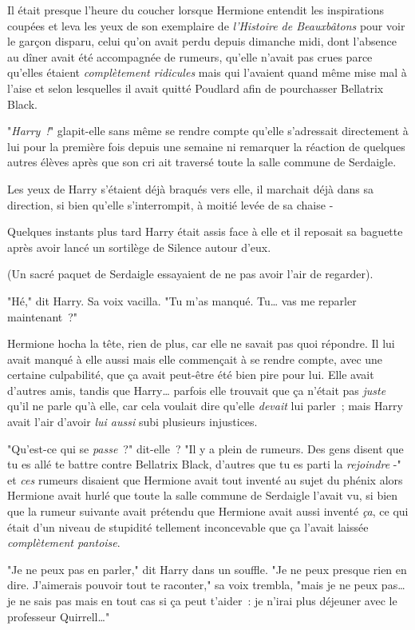 Il était presque l'heure du coucher lorsque Hermione entendit les inspirations coupées et leva les yeux de son exemplaire de \emph{l'Histoire de Beauxbâtons} pour voir le garçon disparu, celui qu'on avait perdu depuis dimanche midi, dont l'absence au dîner avait été accompagnée de rumeurs, qu'elle n'avait pas crues parce qu'elles étaient \emph{complètement ridicules} mais qui l'avaient quand même mise mal à l'aise et selon lesquelles il avait quitté Poudlard afin de pourchasser Bellatrix Black.

"\emph{Harry~!}" glapit-elle sans même se rendre compte qu'elle s'adressait directement à lui pour la première fois depuis une semaine ni remarquer la réaction de quelques autres élèves après que son cri ait traversé toute la salle commune de Serdaigle.

Les yeux de Harry s'étaient déjà braqués vers elle, il marchait déjà dans sa direction, si bien qu'elle s'interrompit, à moitié levée de sa chaise -

Quelques instants plus tard Harry était assis face à elle et il reposait sa baguette après avoir lancé un sortilège de Silence autour d'eux.

(Un sacré paquet de Serdaigle essayaient de ne pas avoir l'air de regarder).

"Hé," dit Harry. Sa voix vacilla. "Tu m'as manqué. Tu… vas me reparler maintenant~?"

Hermione hocha la tête, rien de plus, car elle ne savait pas quoi répondre. Il lui avait manqué à elle aussi mais elle commençait à se rendre compte, avec une certaine culpabilité, que ça avait peut-être été bien pire pour lui. Elle avait d'autres amis, tandis que Harry… parfois elle trouvait que ça n'était pas \emph{juste} qu'il ne parle qu'à elle, car cela voulait dire qu'elle \emph{devait} lui parler~; mais Harry avait l'air d'avoir \emph{lui aussi} subi plusieurs injustices.

"Qu'est-ce qui se \emph{passe}~?" dit-elle~? "Il y a plein de rumeurs. Des gens disent que tu es allé te battre contre Bellatrix Black, d'autres que tu es parti la \emph{rejoindre} -" et \emph{ces} rumeurs disaient que Hermione avait tout inventé au sujet du phénix alors Hermione avait hurlé que toute la salle commune de Serdaigle l'avait vu, si bien que la rumeur suivante avait prétendu que Hermione avait aussi inventé \emph{ça}, ce qui était d'un niveau de stupidité tellement inconcevable que ça l'avait laissée \emph{complètement pantoise}.

"Je ne peux pas en parler," dit Harry dans un souffle. "Je ne peux presque rien en dire. J'aimerais pouvoir tout te raconter," sa voix trembla, "mais je ne peux pas… je ne sais pas mais en tout cas si ça peut t'aider~: je n'irai plus déjeuner avec le professeur Quirrell…"


